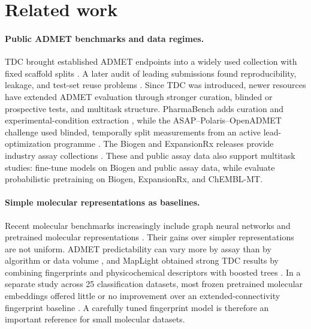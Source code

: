 \section{Related work}
\label{sec:related}

\paragraph{Public ADMET benchmarks and data regimes.}
TDC brought established ADMET endpoints into a widely used collection with fixed scaffold splits
\citep{huang2021tdc}. A later audit of leading submissions found reproducibility, leakage, and
test-set reuse problems \citep{koleiev2026enduser}. Since TDC was introduced, newer resources have
extended ADMET evaluation through stronger curation, blinded or prospective tests, and multitask
structure. PharmaBench adds curation and experimental-condition extraction
\citep{niu2024pharmabench}, while the ASAP--Polaris--OpenADMET challenge used blinded, temporally
split measurements from an active lead-optimization programme
\citep{macdermottopeskin2025blind}. The Biogen and ExpansionRx releases provide industry assay
collections \citep{fang2023prospective,openadmet2026expansionrx}. These and public assay data also
support multitask studies: \citet{adrian2025multitask} fine-tune models on Biogen and public assay
data, while \citet{xue2026probabilistic} evaluate probabilistic pretraining on Biogen, ExpansionRx,
and ChEMBL-MT.

\paragraph{Simple molecular representations as baselines.}
Recent molecular benchmarks increasingly include graph neural networks and pretrained molecular
representations \citep{li2024muben,praski2025benchmarking}. Their gains over simpler representations
are not uniform. ADMET predictability can vary more by assay than by algorithm or data volume
\citep{aleksic2022predictability}, and MapLight obtained strong TDC results by combining fingerprints
and physicochemical descriptors with boosted trees \citep{notwell2023maplight}. In a separate study
across 25 classification datasets, most frozen pretrained molecular embeddings offered little or no
improvement over an extended-connectivity fingerprint baseline \citep{praski2025benchmarking}. A carefully tuned
fingerprint model is therefore an important reference for small molecular datasets.


